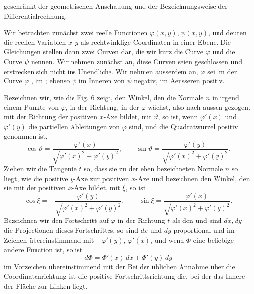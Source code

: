 
geschränkt der geometrischen Anschauung und der Bezeichnungsweise der Differentialrechnung.

Wir betrachten zunächst zwei reelle Functionen $\varphi(x,y)$, $\psi(x,y)$, und deuten die reellen Variablen $x, y$ als rechtwinklige Coordinaten in einer Ebene. Die Gleichungen
stellen dann zwei Curven dar, die wir kurz die Curve $\varphi$ und die Curve $\psi$ nennen. Wir nehmen zunächst an, diese Curven seien geschlossen und erstrecken sich nicht ins Unendliche. Wir nehmen ausserdem an, $\varphi$ sei im  der Curve $\varphi$ , im  ; ebenso $\psi$ im Inneren von $\psi$ negativ, im Aeusseren positiv.

Bezeichnen wir, wie die Fig. 6 zeigt, den Winkel, den die Normale $n$ in irgend einem Punkte von $\varphi$, in der Richtung, in der $\varphi$ wächst, also nach aussen gezogen, mit der Richtung der positiven $x$-Axe bildet, mit $\vartheta$, so ist, wenn $\varphi'(x)$ und $\varphi'(y)$ die partiellen Ableitungen von $\varphi$ sind, und die Quadratwurzel positiv genommen ist,
\[
\cos\vartheta = \frac{\varphi'(x)}{\sqrt{\varphi'(x)^2 + \varphi'(y)^2}},\qquad \sin\vartheta = \frac{\varphi'(y)}{\sqrt{\varphi'(x)^2 + \varphi'(y)^2}}.
\]
Ziehen wir die Tangente $t$ so, dass sie zu der eben bezeichneten Normale $n$ so liegt, wie die positive $y$-Axe zur positiven $x$-Axe und bezeichnen den Winkel, den sie mit der positiven $x$-Axe bildet, mit $\xi$, so ist
\[
\cos\xi = -\frac{\varphi'(y)}{\sqrt{\varphi'(x)^2 + \varphi'(y)^2}},\qquad \sin\xi = \frac{\varphi'(x)}{\sqrt{\varphi'(x)^2 + \varphi'(y)^2}}.
\]
Bezeichnen wir den Fortschritt auf $\varphi$ in der Richtung $t$ als den  und sind $dx, dy$ die Projectionen dieses Fortschrittes, so sind $dx$ und $dy$ proportional und im Zeichen übereinstimmend mit $-\varphi'(y)$, $\varphi'(x)$, und wenn $\Phi$ eine beliebige andere Function ist, so ist
\[
d\Phi = \Phi'(x)\,dx + \Phi'(y)\,dy
\]
im Vorzeichen übereinstimmend mit der 
Bei der üblichen Annahme über die Coordinatenrichtung ist die positive Fortschrittsrichtung die, bei der das Innere der Fläche zur Linken liegt.
